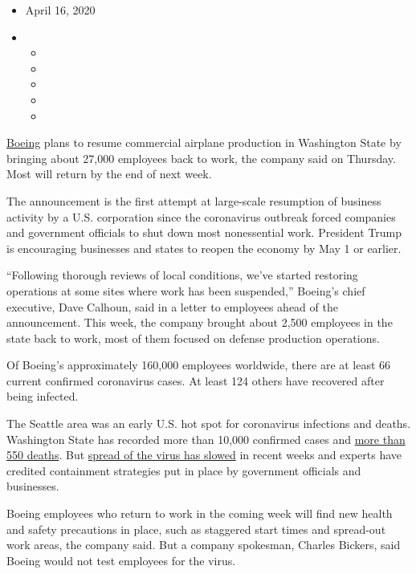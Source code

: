 \begin{itemize}
\item
  April 16, 2020
\item
  \begin{itemize}
  \item
  \item
  \item
  \item
  \item
  \end{itemize}
\end{itemize}

\href{https://www.nytimes3xbfgragh.onion/2020/04/29/business/boeing-layoffs-coronavirus.html}{Boeing}
plans to resume commercial airplane production in Washington State by
bringing about 27,000 employees back to work, the company said on
Thursday. Most will return by the end of next week.

The announcement is the first attempt at large-scale resumption of
business activity by a U.S. corporation since the coronavirus outbreak
forced companies and government officials to shut down most nonessential
work. President Trump is encouraging businesses and states to reopen the
economy by May 1 or earlier.

``Following thorough reviews of local conditions, we've started
restoring operations at some sites where work has been suspended,''
Boeing's chief executive, Dave Calhoun, said in a letter to employees
ahead of the announcement. This week, the company brought about 2,500
employees in the state back to work, most of them focused on defense
production operations.

Of Boeing's approximately 160,000 employees worldwide, there are at
least 66 current confirmed coronavirus cases. At least 124 others have
recovered after being infected.

The Seattle area was an early U.S. hot spot for coronavirus infections
and deaths. Washington State has recorded more than 10,000 confirmed
cases and \href{https://www.doh.wa.gov/emergencies/coronavirus}{more
than 550 deaths}. But
\href{https://www.nytimes3xbfgragh.onion/2020/03/29/us/seattle-washington-state-coronavirus-transmission-rate.html}{spread
of the virus has slowed} in recent weeks and experts have credited
containment strategies put in place by government officials and
businesses.

Boeing employees who return to work in the coming week will find new
health and safety precautions in place, such as staggered start times
and spread-out work areas, the company said. But a company spokesman,
Charles Bickers, said Boeing would not test employees for the virus.

